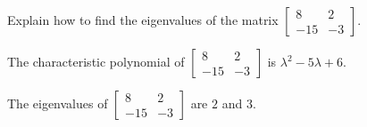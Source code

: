 
\begin{exerciseStatement}


Explain how to find the eigenvalues of the matrix \( \left[\begin{array}{cc}
8 & 2 \\
-15 & -3
\end{array}\right] \).


\end{exerciseStatement}
    
\begin{exerciseAnswer} 


The characteristic polynomial of \( \left[\begin{array}{cc}
8 & 2 \\
-15 & -3
\end{array}\right] \) is \( \lambda^{2} - 5 \lambda + 6 \).



The eigenvalues of \( \left[\begin{array}{cc}
8 & 2 \\
-15 & -3
\end{array}\right] \) are \( 2 \) and \( 3 \).


\end{exerciseAnswer}
    

